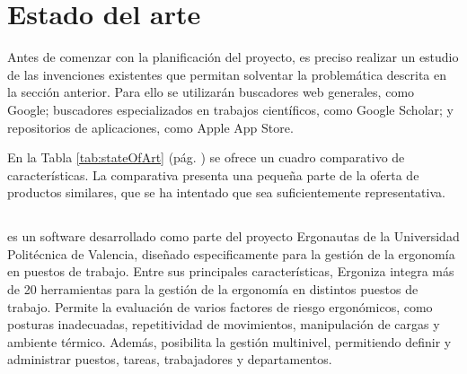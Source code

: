\section{Estado del arte}
\label{sec:stateOfArt}

Antes de comenzar con la planificación del proyecto, es preciso realizar un estudio de las invenciones existentes que permitan solventar la problemática descrita en la sección anterior. Para ello se utilizarán buscadores web generales, como Google; buscadores especializados en trabajos científicos, como Google Scholar; y repositorios de aplicaciones, como Apple App Store.


En la Tabla \ref{tab:stateOfArt} (pág. \pageref{tab:stateOfArt}) se ofrece un cuadro comparativo de características. La comparativa presenta una pequeña parte de la oferta de productos similares, que se ha intentado que sea suficientemente representativa.


\subsection*{} %
\label{sec:ergoniza}
 \cite{ergoniza} es un software desarrollado como parte del proyecto Ergonautas de la Universidad Politécnica de Valencia, diseñado especificamente para la gestión de la ergonomía en puestos de trabajo. 
Entre sus principales características, Ergoniza integra más de 20 herramientas para la gestión de la ergonomía en distintos puestos de trabajo. Permite la evaluación de varios factores de riesgo ergonómicos, como posturas inadecuadas, repetitividad de movimientos, manipulación de cargas y ambiente térmico. Además, posibilita la gestión multinivel, permitiendo definir y administrar puestos, tareas, trabajadores y departamentos.

